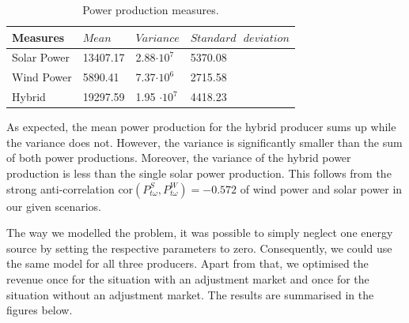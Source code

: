 \begin{table}[h!]
	\centering
	\begin{threeparttable}
		\caption{Power production measures.}
		\begin{tabular}{llll}
			\toprule
			Measures & \( Mean \) & \( Variance \) & \( Standard \text{ } deviation \)  \\
			\midrule
			Solar Power    & 13407.17        &  2.88$\cdot 10^7$      &  5370.08     	    \\
			Wind Power    & 5890.41     &   7.37$\cdot 10^6$      &  2715.58          	\\
			Hybrid    &  19297.59        &  1.95 $\cdot 10^7$    & 4418.23     	\\
			\bottomrule
		\end{tabular}
		
	\end{threeparttable}
\end{table}

As expected, the mean power production for the hybrid producer sums up while the variance does not. However, the variance is significantly smaller than the sum of both power productions. Moreover, the variance of the hybrid power production is less than the single solar power production. This follows from the strong anti-correlation $ \text{cor} (P_{t\omega}^S,P_{t\omega}^W ) = -0.572 $ of wind power and solar power in our given scenarios.  





The way we modelled the problem, it was possible to simply neglect one energy source by setting the respective parameters to zero. Consequently, we could use the same model for all three producers. Apart from that, we optimised the revenue once for the situation with an adjustment market and once for the situation without an adjustment market. The results are summarised in the figures below.  

